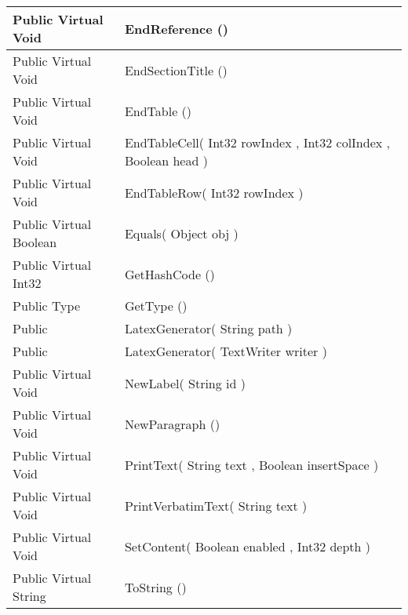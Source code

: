 \documentclass[11pt, oneside, a4paper]{book}
\begin{document}
\begin{center}
\begin{tabular}{| p{3cm} | p{12cm} | }
\hline
 Public  Virtual  Void &  EndReference ()\hypertarget{SoftwareEngineeringTools.{}Documentation.{}LatexGenerator.{}EndReference}{}\\
\hline
 Public  Virtual  Void &  EndSectionTitle ()\hypertarget{SoftwareEngineeringTools.{}Documentation.{}LatexGenerator.{}EndSectionTitle}{}\\
\hline
 Public  Virtual  Void &  EndTable ()\hypertarget{SoftwareEngineeringTools.{}Documentation.{}LatexGenerator.{}EndTable}{}\\
\hline
 Public  Virtual  Void &  EndTableCell(\hypertarget{SoftwareEngineeringTools.{}Documentation.{}LatexGenerator.{}EndTableCell\_Int32\_Int32\_Boolean}{} Int32  rowIndex  ,  Int32  colIndex  ,  Boolean  head  )\\
\hline
 Public  Virtual  Void &  EndTableRow(\hypertarget{SoftwareEngineeringTools.{}Documentation.{}LatexGenerator.{}EndTableRow\_Int32}{} Int32  rowIndex  )\\
\hline
 Public  Virtual  Boolean &  Equals(\hypertarget{SoftwareEngineeringTools.{}Documentation.{}LatexGenerator.{}Equals\_Object}{} Object  obj  )\\
\hline
 Public  Virtual  Int32 &  GetHashCode ()\hypertarget{SoftwareEngineeringTools.{}Documentation.{}LatexGenerator.{}GetHashCode}{}\\
\hline
 Public  Type &  GetType ()\hypertarget{SoftwareEngineeringTools.{}Documentation.{}LatexGenerator.{}GetType}{}\\
\hline
 Public  &  LatexGenerator(\hypertarget{SoftwareEngineeringTools.{}Documentation.{}LatexGenerator.{}LatexGenerator\_String}{} String  path  )\\
\hline
 Public  &  LatexGenerator(\hypertarget{SoftwareEngineeringTools.{}Documentation.{}LatexGenerator.{}LatexGenerator\_TextWriter}{} TextWriter  writer  )\\
\hline
 Public  Virtual  Void &  NewLabel(\hypertarget{SoftwareEngineeringTools.{}Documentation.{}LatexGenerator.{}NewLabel\_String}{} String  id  )\\
\hline
 Public  Virtual  Void &  NewParagraph ()\hypertarget{SoftwareEngineeringTools.{}Documentation.{}LatexGenerator.{}NewParagraph}{}\\
\hline
 Public  Virtual  Void &  PrintText(\hypertarget{SoftwareEngineeringTools.{}Documentation.{}LatexGenerator.{}PrintText\_String\_Boolean}{} String  text  ,  Boolean  insertSpace  )\\
\hline
 Public  Virtual  Void &  PrintVerbatimText(\hypertarget{SoftwareEngineeringTools.{}Documentation.{}LatexGenerator.{}PrintVerbatimText\_String}{} String  text  )\\
\hline
 Public  Virtual  Void &  SetContent(\hypertarget{SoftwareEngineeringTools.{}Documentation.{}LatexGenerator.{}SetContent\_Boolean\_Int32}{} Boolean  enabled  ,  Int32  depth  )\\
\hline
 Public  Virtual  String &  ToString ()\hypertarget{SoftwareEngineeringTools.{}Documentation.{}LatexGenerator.{}ToString}{}\\
\hline
\end{tabular}
\end{center}
 
\end{document}
